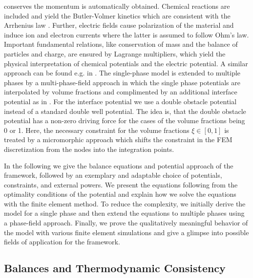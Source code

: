 conserves the momentum is automatically obtained. Chemical reactions are included and yield the Butler-Volmer kinetics which are consistent with the Arrhenius law \supercite{bazant_theory_2013}. Further, electric fields cause polarization of the material and induce ion and electron currents where the latter is assumed to follow Ohm's law. Important fundamental relations, like conservation of mass and the balance of particles and charge, are ensured by Lagrange multipliers, which yield the physical interpretation of chemical potentials and the electric potential. A similar approach can be found e.g. in . The single-phase model is extended to multiple phases by a multi-phase-field approach in which the single phase potentials are interpolated by volume fractions and complimented by an additional interface potential as in . For the interface potential we use a double obstacle potential \supercite{steinbach_multi_2006} instead of a standard double well potential. The idea is, that the double obstacle potential has a non-zero driving force for the cases of the volume fractions being 0 or 1. Here, the necessary constraint for the volume fractions $\xi\in[0,1]$ is treated by a micromorphic approach \supercite{forest_micromorphic_2009} which shifts the constraint in the FEM discretization from the nodes into the integration points. 

In the following we give the balance equations and potential approach of the framework, followed by an exemplary and adaptable choice of potentials, constraints, and external powers. We present the equations following from the optimality conditions of the potential and explain how we solve the equations with the finite element method. To reduce the complexity, we initially derive the model for a single phase and then extend the equations to multiple phases using a phase-field approach. Finally, we prove the qualitatively meaningful behavior of the model with various finite element simulations and give a glimpse into possible fields of application for the framework.


\subsection{Balances and Thermodynamic Consistency} \label{sec:balances}%

